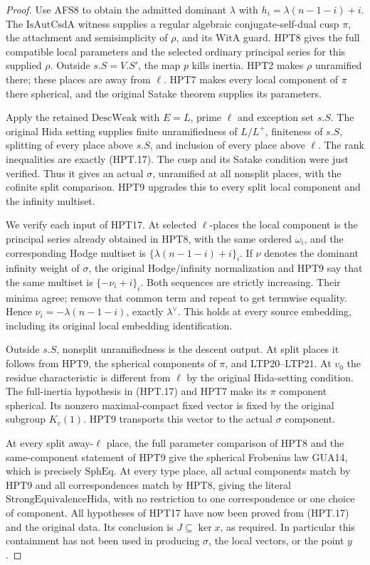 \begin{proof}
Use AFS8 to obtain the admitted dominant $\lambda$ with
$h_i=\lambda(n-1-i)+i$.  The $\mathrm{IsAutCsdA}$ witness
supplies a regular algebraic conjugate-self-dual cusp $\pi$,
the attachment and semisimplicity of $\rho$, and its $\mathrm{WitA}$
guard.  HPT8 gives the full compatible local parameters and
the selected ordinary principal series for this supplied
$\rho$.  Outside $s.S=V.S'$, the map $p$ kills inertia.
HPT2 makes $\rho$ unramified there; these places are away from
$\ell$.  HPT7 makes every local component of $\pi$ there
spherical, and the original Satake theorem supplies its parameters.

Apply the retained $\mathrm{DescWeak}$ with $E=L$, prime $\ell$
and exception set $s.S$.  The original Hida setting supplies
finite unramifiedness of $L/L^+$, finiteness of $s.S$, splitting
of every place above $s.S$, and inclusion of every place above
$\ell$.  The rank inequalities are exactly (HPT.17).  The
cusp and its Satake condition were just verified.  Thus it gives
an actual $\sigma$, unramified at all nonsplit places, with the
cofinite split comparison.  HPT9 upgrades this to every split
local component and the infinity multiset.

We verify each input of HPT17.  At selected $\ell$-places the
local component is the principal series already obtained in HPT8,
with the same ordered $\omega_i$, and the corresponding Hodge
multiset is $\{\lambda(n-1-i)+i\}_i$.  If $\nu$ denotes the
dominant infinity weight of $\sigma$, the original Hodge/infinity
normalization and HPT9 say that the same multiset is
$\{-\nu_i+i\}_i$.  Both sequences are strictly increasing.
Their minima agree; remove that common term and repeat to get
termwise equality.  Hence $\nu_i=-\lambda(n-1-i)$, exactly
$\lambda^\vee$.  This holds at every source embedding, including
its original local embedding identification.

Outside $s.S$, nonsplit unramifiedness is the descent output.
At split places it follows from HPT9, the spherical components
of $\pi$, and LTP20--LTP21.  At $v_0$ the residue characteristic
is different from $\ell$ by the original Hida-setting condition.
The full-inertia hypothesis in (HPT.17) and HPT7 make its
$\pi$ component spherical.  Its nonzero maximal-compact fixed
vector is fixed by the original subgroup $K_c(1)$.  HPT9
transports this vector to the actual $\sigma$ component.

At every split away-$\ell$ place, the full parameter comparison
of HPT8 and the same-component statement of HPT9 give the
spherical Frobenius law GUA14, which is precisely
$\mathrm{SphEq}$.  At every type place, all actual components
match by HPT9 and all correspondences match by HPT8, giving
the literal $\mathrm{StrongEquivalenceHida}$, with no restriction
to one correspondence or one choice of component.  All hypotheses
of HPT17 have now been proved from (HPT.17) and the original
data.  Its conclusion is $J\subseteq\ker x$, as required.
In particular this containment has not been used in producing
$\sigma$, the local vectors, or the point $y$.
\end{proof}
